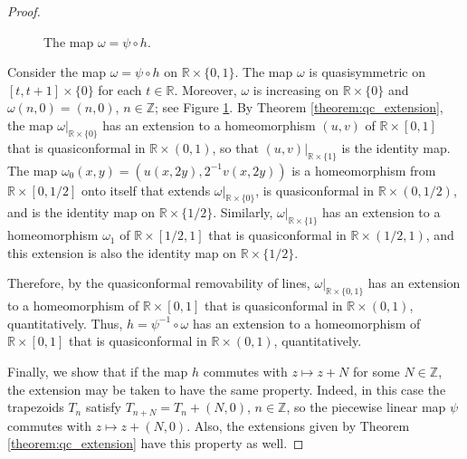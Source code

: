 \documentclass[letterpaper]{amsart}
\theoremstyle{plain}
\theoremstyle{definition}
\theoremstyle{remark}
\numberwithin{equation}{section}
\numberwithin{theorem}{section}
\newcommand{\R}{\mathbb R}
\newcommand{\Z}{\mathbb Z}
\begin{document}
\begin{proof}
\begin{figure}
		\caption{The map $\omega= \psi\circ h$.}\label{fig:composition}
\end{figure}

Consider the map $\omega=\psi\circ h$ on $\R\times \{0,1\}$.  The map $\omega$ is quasisymmetric on $[t,t+1]\times \{0\}$ for each $t\in \R$. Moreover,  $\omega$ is increasing on $\R\times \{0\}$ and $\omega(n,0)=(n,0)$, $n\in \Z$; see Figure \ref{fig:composition}. By Theorem \ref{theorem:qc_extension}, the map $\omega|_{\R\times \{0\}}$  has an extension to a homeomorphism $(u,v)$ of $\R\times [0,1]$ that is quasiconformal in $\R\times (0,1)$, so that $(u,v)|_{\R\times \{1\}}$ is the identity map. The map $\omega_0(x,y)=(u(x,2y), 2^{-1}v(x,2y))$ is a homeomorphism from $\R\times[0,1/2]$ onto itself that extends $\omega|_{\R\times \{0\}}$, is quasiconformal in $\R\times (0,1/2)$, and is the identity map on $\R\times \{1/2\}$.  Similarly, $\omega|_{\R\times \{1\}}$ has an extension to a  homeomorphism $\omega_1$ of $\R\times [1/2,1]$ that is quasiconformal in $\R\times (1/2,1)$, and this extension is also the identity map on $\R\times \{1/2\}$. 

Therefore, by the quasiconformal removability of lines, $\omega|_{\R\times \{0,1\}}$ has an extension to a homeomorphism of $\R\times [0,1]$ that is quasiconformal in $\R\times (0,1)$, quantitatively. Thus, $h=\psi^{-1}\circ \omega$ has an extension to a homeomorphism of $\R\times [0,1]$ that is quasiconformal in $\R\times (0,1)$, quantitatively.  

Finally, we show that if the map $h$ commutes with $z\mapsto z+N$ for some $N\in \Z$, the extension may be taken to have the same property. Indeed, in this case the trapezoids $T_n$ satisfy $T_{n+N}=T_n+(N,0)$, $n\in \Z$, so the piecewise linear map $\psi$ commutes with $z\mapsto z+(N,0)$. Also, the extensions given by Theorem \ref{theorem:qc_extension} have this property as well.
\end{proof}
\end{document}
